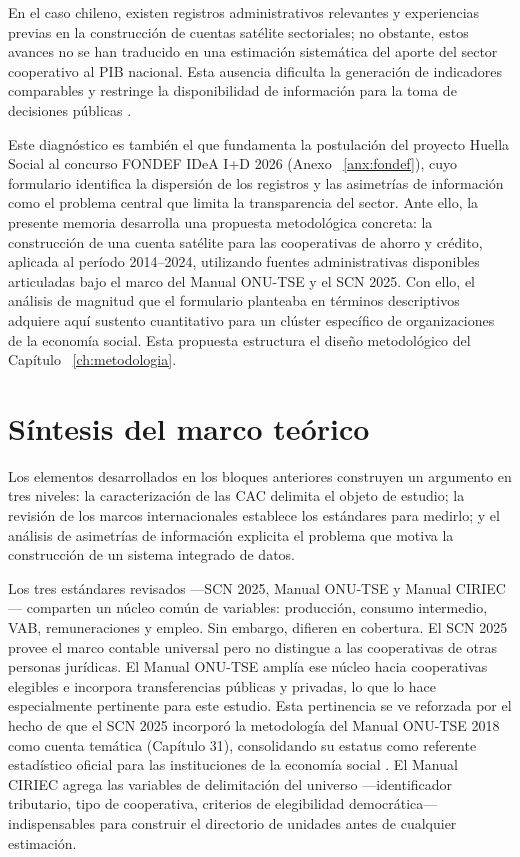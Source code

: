 En el caso chileno, existen registros administrativos relevantes y experiencias previas
en la construcción de cuentas satélite sectoriales; no obstante, estos avances no se
han traducido en una estimación sistemática del aporte del sector cooperativo al PIB
nacional. Esta ausencia dificulta la generación de indicadores comparables y restringe
la disponibilidad de información para la toma de decisiones públicas
.

Este diagnóstico es también el que fundamenta la postulación del proyecto Huella Social al concurso FONDEF IDeA I+D 2026 (Anexo ~\ref{anx:fondef}), cuyo formulario identifica la dispersión de los registros y las asimetrías de información como el problema central que limita la transparencia del sector. Ante ello, la presente memoria desarrolla una propuesta metodológica concreta: la construcción de una cuenta satélite para las cooperativas de ahorro y crédito, aplicada al período 2014–2024, utilizando fuentes administrativas disponibles articuladas bajo el marco del Manual ONU-TSE y el SCN 2025. Con ello, el análisis de magnitud que el formulario planteaba en términos descriptivos adquiere aquí sustento cuantitativo para un clúster específico de organizaciones de la economía social. Esta propuesta estructura el diseño metodológico del Capítulo ~\ref{ch:metodologia}.



\section{Síntesis del marco teórico}
\label{sec:sintesis-marco}
Los elementos desarrollados en los bloques anteriores construyen un argumento en tres niveles: 
la caracterización de las CAC delimita el objeto de estudio; la revisión de los marcos 
internacionales establece los estándares para medirlo; y el análisis de asimetrías de información 
explicita el problema que motiva la construcción de un sistema integrado de datos.
 
Los tres estándares revisados ---SCN 2025, Manual ONU-TSE \cite{vereinte_nationen_satellite_2018} 
y Manual CIRIEC \cite{barea_tejeiro_manual_2007}--- comparten un núcleo común de variables: 
producción, consumo intermedio, VAB, remuneraciones y empleo. Sin embargo, difieren en 
cobertura. El SCN 2025 provee el marco contable universal pero no distingue a las cooperativas 
de otras personas jurídicas. El Manual ONU-TSE amplía ese núcleo hacia cooperativas elegibles 
e incorpora transferencias públicas y privadas, lo que lo hace especialmente pertinente para este 
estudio. Esta pertinencia se ve reforzada por el hecho de que el SCN 2025 incorporó la 
metodología del Manual ONU-TSE 2018 como cuenta temática (Capítulo 31), consolidando su 
estatus como referente estadístico oficial para las instituciones de la economía social 
\cite{united_nations_system_2025,carini_framework_2026}. El Manual CIRIEC agrega las 
variables de delimitación del universo ---identificador tributario, tipo de cooperativa, criterios 
de elegibilidad democrática--- indispensables para construir el directorio de unidades antes de 
cualquier estimación.
 
